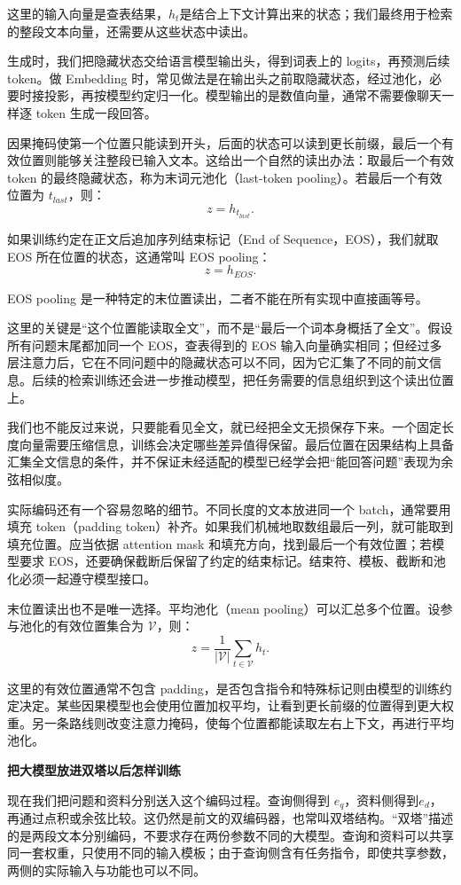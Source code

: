 这里的输入向量是查表结果，\(h_{t}\)是结合上下文计算出来的状态；我们最终用于检索的整段文本向量，还需要从这些状态中读出。

生成时，我们把隐藏状态交给语言模型输出头，得到词表上的 logits，再预测后续 token。做 Embedding 时，常见做法是在输出头之前取隐藏状态，经过池化，必要时接投影，再按模型约定归一化。模型输出的是数值向量，通常不需要像聊天一样逐 token 生成一段回答。

因果掩码使第一个位置只能读到开头，后面的状态可以读到更长前缀，最后一个有效位置则能够关注整段已输入文本。这给出一个自然的读出办法：取最后一个有效 token 的最终隐藏状态，称为末词元池化（last-token pooling）。若最后一个有效位置为 \(t_{last}\)，则：
\[z = h_{t_{last}}.\]

如果训练约定在正文后追加序列结束标记（End of Sequence，EOS），我们就取 EOS 所在位置的状态，这通常叫 EOS pooling：
\[z = h_{EOS}.\]

EOS pooling 是一种特定的末位置读出，二者不能在所有实现中直接画等号。

这里的关键是``这个位置能读取全文''，而不是``最后一个词本身概括了全文''。假设所有问题末尾都加同一个 EOS，查表得到的 EOS 输入向量确实相同；但经过多层注意力后，它在不同问题中的隐藏状态可以不同，因为它汇集了不同的前文信息。后续的检索训练还会进一步推动模型，把任务需要的信息组织到这个读出位置上。

我们也不能反过来说，只要能看见全文，就已经把全文无损保存下来。一个固定长度向量需要压缩信息，训练会决定哪些差异值得保留。最后位置在因果结构上具备汇集全文信息的条件，并不保证未经适配的模型已经学会把``能回答问题''表现为余弦相似度。

实际编码还有一个容易忽略的细节。不同长度的文本放进同一个 batch，通常要用填充 token（padding token）补齐。如果我们机械地取数组最后一列，就可能取到填充位置。应当依据 attention mask 和填充方向，找到最后一个有效位置；若模型要求 EOS，还要确保截断后保留了约定的结束标记。结束符、模板、截断和池化必须一起遵守模型接口。

末位置读出也不是唯一选择。平均池化（mean pooling）可以汇总多个位置。设参与池化的有效位置集合为 \(\mathcal{V}\)，则：
\[z = \frac{1}{\left| \mathcal{V} \right|}\sum_{t\mathcal{\in V}}^{}h_{t}.\]

这里的有效位置通常不包含 padding，是否包含指令和特殊标记则由模型的训练约定决定。某些因果模型也会使用位置加权平均，让看到更长前缀的位置得到更大权重。另一条路线则改变注意力掩码，使每个位置都能读取左右上下文，再进行平均池化。

\textbf{把大模型放进双塔以后怎样训练}

现在我们把问题和资料分别送入这个编码过程。查询侧得到 \(e_{q}\)，资料侧得到\(e_{d}\)，再通过点积或余弦比较。这仍然是前文的双编码器，也常叫双塔结构。``双塔''描述的是两段文本分别编码，不要求存在两份参数不同的大模型。查询和资料可以共享同一套权重，只使用不同的输入模板；由于查询侧含有任务指令，即使共享参数，两侧的实际输入与功能也可以不同。

